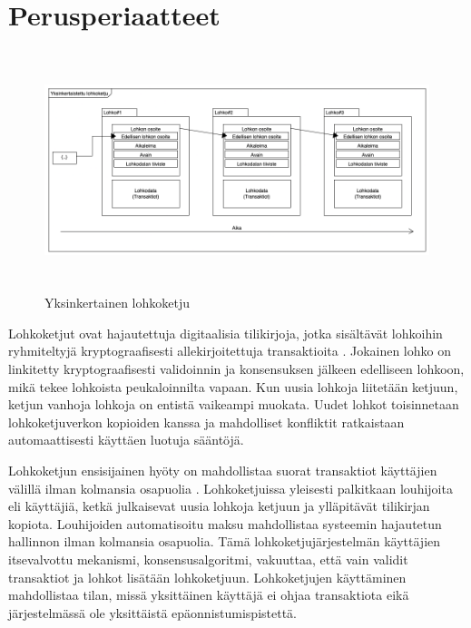 \documentclass[utf8,bachelor]{gradu3}
\begin{document}
\section{Perusperiaatteet}

\begin{figure}[h]\centering
  \includegraphics[height=7cm,keepaspectratio]{lohkoketjuDiag}
  \caption[Yksinkertainen lohkoketju]{Yksinkertainen lohkoketju}
  \label{fig:Lohkoketju}
\end{figure}

Lohkoketjut ovat hajautettuja digitaalisia tilikirjoja, jotka sisältävät lohkoihin ryhmiteltyjä kryptograafisesti allekirjoitettuja transaktioita \parencite{yaga2019blockchain}.
Jokainen lohko on linkitetty kryptograafisesti validoinnin ja konsensuksen jälkeen edelliseen lohkoon, mikä tekee lohkoista peukaloinnilta vapaan.
Kun uusia lohkoja liitetään ketjuun, ketjun vanhoja lohkoja on entistä vaikeampi muokata. 
Uudet lohkot toisinnetaan lohkoketjuverkon kopioiden kanssa ja mahdolliset konfliktit ratkaistaan automaattisesti käyttäen luotuja sääntöjä.


Lohkoketjun ensisijainen hyöty on mahdollistaa suorat transaktiot käyttäjien välillä ilman kolmansia osapuolia \parencite{yaga2019blockchain}.
Lohkoketjuissa yleisesti palkitkaan louhijoita eli käyttäjiä, ketkä julkaisevat uusia lohkoja ketjuun ja ylläpitävät tilikirjan kopiota.
Louhijoiden automatisoitu maksu mahdollistaa systeemin hajautetun hallinnon ilman kolmansia osapuolia.
Tämä lohkoketjujärjestelmän käyttäjien itsevalvottu mekanismi, konsensusalgoritmi, vakuuttaa, että vain validit transaktiot ja lohkot lisätään lohkoketjuun.
Lohkoketjujen käyttäminen mahdollistaa tilan, missä yksittäinen käyttäjä ei ohjaa transaktiota eikä järjestelmässä ole yksittäistä epäonnistumispistettä.
\end{document}
